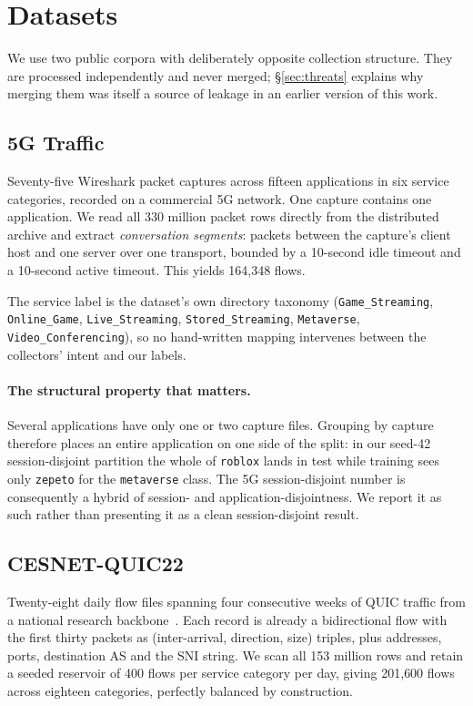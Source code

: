 \section{Datasets}
\label{sec:datasets}

We use two public corpora with deliberately opposite collection structure. They
are processed independently and never merged; \S\ref{sec:threats} explains why
merging them was itself a source of leakage in an earlier version of this work.

\subsection{5G Traffic}

Seventy-five Wireshark packet captures across fifteen applications in six
service categories, recorded on a commercial 5G network. One capture contains
one application. We read all 330 million packet rows directly from the
distributed archive and extract \emph{conversation segments}: packets between
the capture's client host and one server over one transport, bounded by a
10-second idle timeout and a 10-second active timeout. This yields
164{,}348 flows.

The service label is the dataset's own directory taxonomy
(\texttt{Game\_Streaming}, \texttt{Online\_Game}, \texttt{Live\_Streaming},
\texttt{Stored\_Streaming}, \texttt{Metaverse}, \texttt{Video\_Conferencing}),
so no hand-written mapping intervenes between the collectors' intent and our
labels.

\paragraph{The structural property that matters.} Several applications have only
one or two capture files. Grouping by capture therefore places an entire
application on one side of the split: in our seed-42 session-disjoint partition
the whole of \texttt{roblox} lands in test while training sees only
\texttt{zepeto} for the \texttt{metaverse} class. The 5G session-disjoint
number is consequently a hybrid of session- and application-disjointness. We
report it as such rather than presenting it as a clean session-disjoint result.

\subsection{CESNET-QUIC22}

Twenty-eight daily flow files spanning four consecutive weeks of QUIC traffic
from a national research backbone~\cite{luxemburk2023cesnet}. Each record is
already a bidirectional flow with the first thirty packets as
(inter-arrival, direction, size) triples, plus addresses, ports, destination AS
and the SNI string. We scan all 153 million rows and retain a seeded reservoir
of 400 flows per service category per day, giving 201{,}600 flows across
eighteen categories, perfectly balanced by construction.

